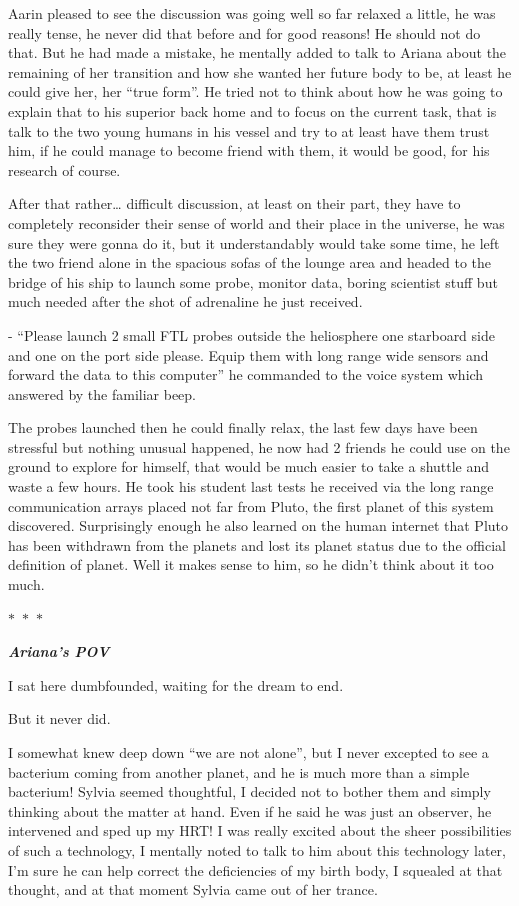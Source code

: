\documentclass[colorlinks,12pt,a4paper]{book}
\newcommand\sep{\begin{center}
  \boldmath $\ast$~$\ast$~$\ast$
\end{center}}
\begin{document}
Aarin pleased to see the discussion was going well so far relaxed a little, he was really tense, 
he never did that before and for good reasons! He should not do that. But he had made a mistake, 
he mentally added to talk to Ariana about the remaining of her transition and how she wanted her future body to be, 
at least he could give her, her  “true form”. He tried not to think about how he was going to explain that to his superior 
back home and to focus on the current task, that is talk to the two young humans in his vessel and try to at least have 
them trust him, if he could manage to become friend with them, it would be good, for his research of course.\par
\bigskip
After that rather… difficult discussion, at least on their part, they have to completely reconsider their 
sense of world and their place in the universe, he was sure they were gonna do it, but it understandably would
 take some time, he left the two friend alone in the spacious sofas of the lounge area and headed to the bridge of 
 his ship to launch some probe, monitor data, boring scientist stuff but much needed after the shot of adrenaline he 
 just received.\par
 \bigskip

- “Please launch 2 small FTL probes outside the heliosphere one starboard side and one on the port side please. 
Equip them with long range wide sensors and forward the data to this computer” he commanded to the voice system 
which answered by the familiar beep.\par
\bigskip

The probes launched then he could finally relax, the last few days have been stressful but nothing unusual happened,
 he now had 2 friends he could use on the ground to explore for himself, that would be much easier to take a 
 shuttle and waste a few hours. He took his student last tests he received via the long range communication arrays
  placed not far from Pluto, the first planet of this system discovered. Surprisingly enough he also learned on 
  the human internet that Pluto has been withdrawn from the planets and lost its planet status due to
   the official definition of planet. Well it makes sense to him, so he didn't think about it too much.

\sep 

\textit{\textbf{Ariana's POV}}\par
\bigskip
I sat here dumbfounded, waiting for the dream to end.\par
\bigskip
But it never did.\par
\bigskip
I somewhat knew deep down “we are not alone”, but I never excepted to see a bacterium coming from another planet, and he is much more than a simple bacterium!
Sylvia seemed thoughtful, I decided not to bother them and simply thinking about the matter at hand. 
Even if he said he was just an observer, he intervened and sped up my HRT! I was really excited about the sheer possibilities 
of such a technology, I mentally noted to talk to him about this technology later, I'm sure he can help correct 
the deficiencies of my birth body, I squealed at that thought, and at that moment Sylvia came out of her trance.\par
\bigskip
\end{document}
